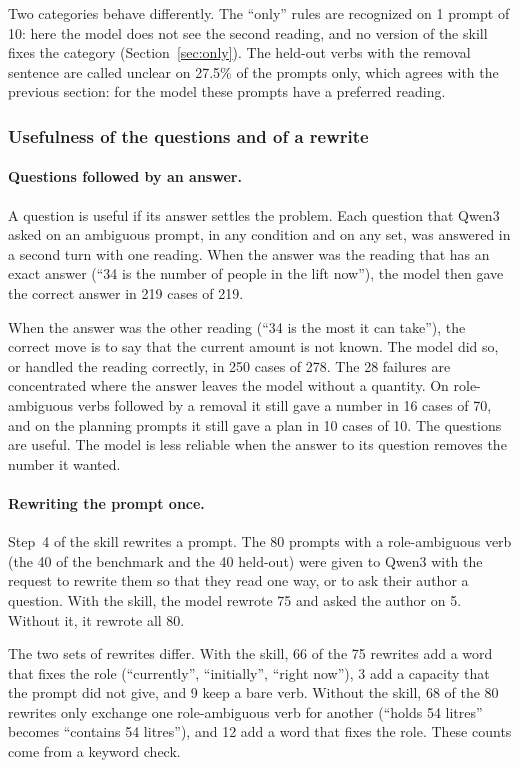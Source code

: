 \documentclass[11pt,a4paper]{article}
\begin{document}
Two categories behave differently. The ``only'' rules are recognized on
1 prompt of 10: here the model does not see the second reading, and no
version of the skill fixes the category (Section~\ref{sec:only}). The
held-out verbs with the removal sentence are called unclear on 27.5\% of
the prompts only, which agrees with the previous section: for the model
these prompts have a preferred reading.

\subsubsection{Usefulness of the questions and of a rewrite}

\paragraph{Questions followed by an answer.}
A question is useful if its answer settles the problem. Each question
that Qwen3 asked on an ambiguous prompt, in any condition and on any set,
was answered in a second turn with one reading. When the answer was the
reading that has an exact answer (``34 is the number of people in the lift
now''), the model then gave the correct answer in 219 cases of 219.

When the answer was the other reading (``34 is the most it can take''),
the correct move is to say that the current amount is not known. The
model did so, or handled the reading correctly, in 250 cases of 278. The
28 failures are concentrated where the answer leaves the model without a
quantity. On role-ambiguous verbs followed by a removal it still gave a
number in 16 cases of 70, and on the planning prompts it still gave a plan
in 10 cases of 10.
The questions are useful. The model is less reliable when the answer to
its question removes the number it wanted.

\paragraph{Rewriting the prompt once.}
Step~4 of the skill rewrites a prompt. The 80 prompts with a role-ambiguous verb (the 40 of the benchmark
and the 40 held-out) were given to Qwen3 with the request to rewrite them so
that they read one way, or to ask their author a question. With the
skill, the model rewrote 75 and asked the author on 5. Without it, it
rewrote all 80.

The two sets of rewrites differ. With the skill, 66 of the 75 rewrites
add a word that fixes the role (``currently'', ``initially'', ``right
now''), 3 add a capacity that the prompt did not give, and 9 keep a bare
verb. Without the skill, 68 of the 80 rewrites only exchange one
role-ambiguous verb for another (``holds 54 litres'' becomes ``contains
54 litres''), and 12 add a word that fixes the role. These counts come
from a keyword check.
\end{document}

